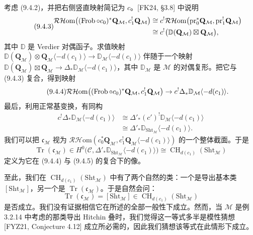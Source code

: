 考虑 (9.4.2)，并把右侧竖直映射简记为 $c$。[FK24, §3.8] 中说明
\begin{equation}\tag{9.4.3}\label{eq:a6-06-5}
\begin{aligned}
\mathcal R\mathcal H\mathrm{om}\big((\operatorname{Frob}\circ c_0)^*\mathbf Q_{\mathcal M},c_1^!\mathbf Q_{\mathcal M}\big)
&\cong c^!\mathcal R\mathcal H\mathrm{om}\big(\mathrm{pr}_0^*\mathbf Q_{\mathcal M},\mathrm{pr}_1^!\mathbf Q_{\mathcal M}\big)\\
&\cong c^!\big(\mathbb D(\mathbf Q_{\mathcal M})\boxtimes\mathbf Q_{\mathcal M}\big),
\end{aligned}
\end{equation}
其中 $\mathbb D$ 是 Verdier 对偶函子。求值映射 $\mathbb D(\mathbf Q_{\mathcal M})\otimes\mathbf Q_{\mathcal M}\langle-d(c_1)\rangle\to\mathbb D_{\mathcal M}\langle-d(c_1)\rangle$ 伴随于一个映射 $\mathbb D(\mathbf Q_{\mathcal M})\boxtimes\mathbf Q_{\mathcal M}\to\Delta_*\mathbb D_{\mathcal M}\langle-d(c_1)\rangle$，其中 $\mathbb D_{\mathcal M}$ 是 $\mathcal M$ 的对偶复形。把它与 (9.4.3) 复合，得到映射
\begin{equation}\tag{9.4.4}\label{eq:a6-06-6}
\mathcal R\mathcal H\mathrm{om}\big((\operatorname{Frob}\circ c_0)^*\mathbf Q_{\mathcal M},c_1^!\mathbf Q_{\mathcal M}\big)\to c^!\Delta_*\mathbb D_{\mathcal M}\langle-d(c_1)\rangle.
\end{equation}
最后，利用正常基变换，有同构
\begin{equation}\tag{9.4.5}\label{eq:a6-06-7}
\begin{aligned}
c^!\Delta_*\mathbb D_{\mathcal M}\langle-d(c_1)\rangle
&\cong\Delta'_*(c')^!\mathbb D_{\mathcal M}\langle-d(c_1)\rangle\\
&\cong\Delta'_*\mathbb D_{\mathrm{Sht}_{\mathcal M}}\langle-d(c_1)\rangle.
\end{aligned}
\end{equation}
我们可以把 $\mathfrak c_{\mathcal M}$ 视为 $\mathcal R\mathcal H\mathrm{om}(c_0^*\mathbf Q_{\mathcal M},c_1^!\mathbf Q_{\mathcal M}\langle-d(c_1)\rangle)$ 的一个整体截面。于是
\[
\operatorname{Tr}(\mathfrak c_{\mathcal M})\in H^0\big(\mathcal C,\Delta'_*\mathbb D_{\mathrm{Sht}_{\mathcal M}}\langle-d(c_1)\rangle\big)\cong\operatorname{CH}_{d(c_1)}(\mathrm{Sht}_{\mathcal M})
\]
定义为它在 (9.4.4) 与 (9.4.5) 的复合下的像。

至此，我们在 $\operatorname{CH}_{d(c_1)}(\mathrm{Sht}_{\mathcal M})$ 中有了两个自然的类：一个是导出基本类 $[\mathrm{Sht}_{\mathcal M}]$，另一个是 $\operatorname{Tr}(\mathfrak c_{\mathcal M})$。于是自然会问：
\[
\operatorname{Tr}(\mathfrak c_{\mathcal M})=[\mathrm{Sht}_{\mathcal M}]\in\operatorname{CH}_{d(c_1)}(\mathrm{Sht}_{\mathcal M})
\]
是否成立。我们没有证据相信它在所述的全部一般性下成立。然而，当 $\mathcal M$ 是例 3.2.14 中考虑的那类导出 Hitchin 叠时，我们觉得这一等式多半是模性猜想 [FYZ21, Conjecture 4.12] 成立所必需的，因此我们猜想该等式在此情形下成立。

